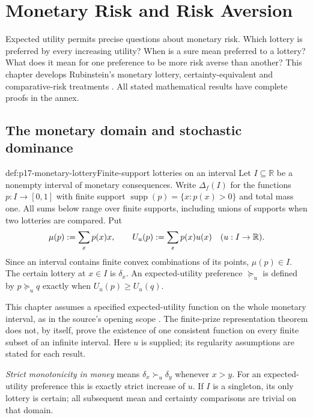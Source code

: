 \chapter{Monetary Risk and Risk Aversion}
\label{sec:p17-risk-aversion}

Expected utility permits precise questions about monetary risk. Which
lottery is preferred by every increasing utility? When is a sure mean
preferred to a lottery? What does it mean for one preference to be more
risk averse than another? This chapter develops Rubinstein's monetary
lottery, certainty-equivalent and comparative-risk treatments
\cite[2015 revision, pp.~108--118]{Rubinstein2015LectureNotes}.
All stated mathematical results have complete proofs in the annex.

\section{The monetary domain and stochastic dominance}
\label{sec:p17-monetary-lotteries}

\begin{hbdefinition}{def:p17-monetary-lottery}{Finite-support lotteries on an interval}
Let \(I\subseteq\mathbb R\) be a nonempty interval of monetary consequences.
Write \(\Delta_f(I)\) for the functions \(p:I\to[0,1]\) with finite
support \(\operatorname{supp}(p)=\{x:p(x)>0\}\) and total mass one.
All sums below range over finite supports, including unions of supports
when two lotteries are compared. Put
\[
       \mu(p)\mathrel{:=}\sum_xp(x)x,\qquad
       U_u(p)\mathrel{:=}\sum_xp(x)u(x)\quad(u:I\to\mathbb R).
\]
Since an interval contains finite convex combinations of its points,
\(\mu(p)\in I\). The certain lottery at \(x\in I\) is \(\delta_x\).
An expected-utility preference \(\succeq_u\) is defined by
\(p\succeq_u q\) exactly when \(U_u(p)\geq U_u(q)\).

This chapter assumes a specified expected-utility function on the whole
monetary interval, as in the source's opening scope
\cite[p.~108]{Rubinstein2015LectureNotes}. The finite-prize representation
theorem does not, by itself, prove the existence of one consistent function
on every finite subset of an infinite interval. Here \(u\) is supplied;
its regularity assumptions are stated for each result.

\emph{Strict monotonicity in money} means
\(\delta_x\succ_u\delta_y\) whenever \(x>y\). For an expected-utility
preference this is exactly strict increase of \(u\).
If \(I\) is a singleton, its only lottery is certain; all subsequent
mean and certainty comparisons are trivial on that domain.
\end{hbdefinition}

